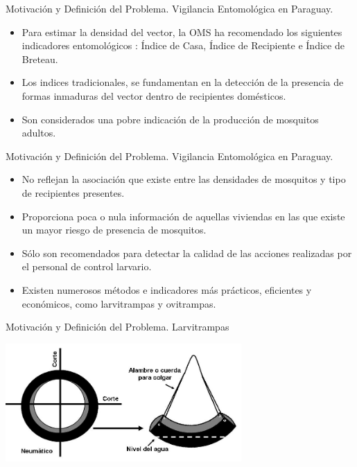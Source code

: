 
\begin{frame}[t]{Motivación y Definición del Problema. Vigilancia Entomológica en Paraguay.}

    \begin{itemize}
      \item Para estimar la densidad del vector, la OMS ha recomendado los siguientes indicadores entomológicos : Índice de Casa, Índice de Recipiente e Índice de Breteau.

      \item  Los indices tradicionales, se fundamentan en la detección de la presencia de formas inmaduras del vector dentro de recipientes domésticos.

      \item Son considerados una pobre indicación de la producción de mosquitos adultos.

    \end{itemize}
\end{frame}


\begin{frame}[t]{Motivación y Definición del Problema. Vigilancia Entomológica en Paraguay.}
    \begin{itemize}
      \item No reflejan la asociación que existe entre las densidades de mosquitos y tipo de recipientes presentes.

      \item Proporciona poca o nula información de aquellas viviendas en las que existe un mayor riesgo de presencia de mosquitos.

      \item Sólo son recomendados para detectar la calidad de las acciones realizadas por el personal de control larvario.

      \item Existen numerosos métodos e indicadores más prácticos, eficientes y económicos, como larvitrampas y ovitrampas.

    \end{itemize}
\end{frame}


\begin{frame}[t]{Motivación y Definición del Problema. Larvitrampas}
  \begin{center}
    \includegraphics[width=9cm]{../book/anexos/graphics/construccion-larvitrampa.png}
  \end{center}
\end{frame}

